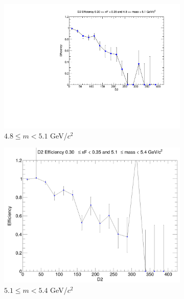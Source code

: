 \documentclass[11pt]{article}
\begin{document}
\begin{figure}[p]
\begin{subfigure}[b]{0.32\textwidth}
        \includegraphics[width=\textwidth]{./kTrackerEfficiencyPlots/D2_Efficiency_xF6_mass2.pdf}
        \caption{$4.8 \leq m < 5.1$ GeV/$c^2$}
    \end{subfigure}\vspace{0.5cm}
    \begin{subfigure}[b]{0.32\textwidth}
        \centering
        \includegraphics[width=\textwidth]{./kTrackerEfficiencyPlots/D2_Efficiency_xF6_mass3.png}
        \caption{$5.1 \leq m < 5.4$ GeV/$c^2$}
    \end{subfigure}\hfill
    \begin{subfigure}[b]{0.32\textwidth}
        \centering

\end{subfigure}
\end{figure}
\end{document}
